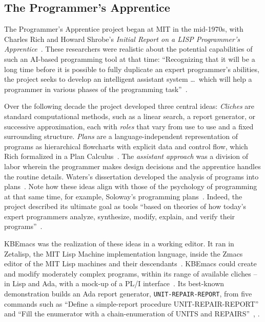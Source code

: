 \documentclass[11pt]{article}
\begin{document}
\subsection{The Programmer's Apprentice}

The Programmer's Apprentice project began at MIT in the mid-1970s,
with Charles Rich and Howard Shrobe's \textit{Initial Report on a LISP
  Programmer's Apprentice}~\cite{richshrobe1976}. These researchers
were realistic about the potential capabilities of such an AI-based
programming tool at that time: ``Recognizing that it will be a long
time before it is possible to fully duplicate an expert programmer's
abilities, the project seeks to develop an intelligent assistant
system \ldots\ which will help a programmer in various phases of the
programming task''~\cite[p.~47]{waters1986aimag}.

Over the following decade the project developed three central ideas:
\emph{Cliches} are standard computational methods, such as a linear
search, a report generator, or successive approximation, each with
\emph{roles} that vary from use to use and a fixed surrounding
structure. \emph{Plans} are a language-independent representation of
programs as hierarchical flowcharts with explicit data and control
flow, which Rich formalized in a Plan
Calculus~\cite{rich1981,richwaters1987overview}. The \emph{assistant
approach} was a division of labor wherein the programmer makes design
decisions and the apprentice handles the routine details.  Waters's
dissertation developed the analysis of programs into
plans~\cite{waters1978}. Note how these ideas align with those of the
psychology of programming at that same time, for example, Soloway's
programming plans~\cite{soloway1984}. Indeed, the project described
its ultimate goal as tools ``based on theories of how today's expert
programmers analyze, synthesize, modify, explain, and verify their
programs''~\cite{pitman1983wp244}.

KBEmacs was the realization of these ideas in a working editor. It
ran in Zetalisp, the MIT Lisp Machine implementation language, inside
the Zmacs editor of the MIT Lisp machines and their
descendants~\cite{pitman1983wp244}. KBEmacs could create and modify moderately complex
programs, within its range of available cliches -- in Lisp and Ada,
with a mock-up of a PL/I interface~\cite{pitman1983wp244}. Its best-known demonstration builds an Ada report generator,
\texttt{UNIT-REPAIR-REPORT}, from five commands such as ``Define a
simple-report procedure UNIT-REPAIR-REPORT'' and ``Fill the enumerator
with a chain-enumeration of UNITS and
REPAIRS''~\cite[p.~48]{waters1986aimag}, \cite{waters1985tse}.
\end{document}
